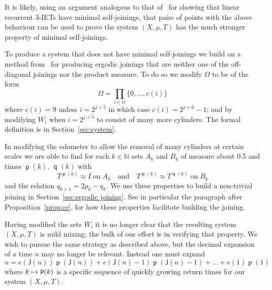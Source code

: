 \documentclass[AHL,Unicode,longabstracts,published]{cedram}
\DeclareMathOperator{\p}{\mathsf{p}}
\DeclareMathOperator{\q}{\mathsf{q}}
\newcommand{\N}{\mathbb{N}}
\newcommand{\scl}{\mathsf{J}}
\let\oldmapsto\mapsto
\renewcommand*{\mapsto}{\mathchoice{\longmapsto}{\oldmapsto}{\oldmapsto}{\oldmapsto}}
\begin{document}
It is likely, using an argument analogous to that of~\cite{MR2129107} for showing that linear recurrent 3-IETs have minimal self-joinings, that pairs of points with the above behaviour can be used to prove the system $(X,\mu,T)$ has the much stronger property of minimal self-joinings.

To produce a system that does not have minimal self-joinings we build on a method from~\cite{MR4269425} for producing ergodic joinings that are neither one of the off-diagonal joinings nor the product measure. To do so we modify $\Omega$ to be of the form
\[
\Omega = \prod_{i \in \N} \{ 0,\dots,c(i) \}
\]
where $c(i) = 9$ unless $i = 2^{j+5}$ in which case $c(i) = 2^{j+6} - 1$; and by modifying $W_i$ when $i = 2^{j+5}$ to consist of many more cylinders. The formal definition is in Section~\ref{sec:system}.

In modifying the odometer to allow the removal of many cylinders at certain scales we are able to find for each $k \in \N$ sets $A_k$ and $B_k$ of measure about 0.5 and times $\p(k)$, $\q(k)$ with
\begin{equation}\label{intro:reduction}
T^{\p(k)} \approx I \;\text{on}\; A_k
\quad\text{and}\quad T^{\p(k)} \approx T^{\q(k)} \;\text{on}\; B_k
\end{equation}
and the relation $q_{k+1} = 2p_k - q_k$. We use these properties to build a non-trivial joining in Section~\ref{sec:ergodic joining}. See in particular the paragraph after Proposition~\ref{prop:ce}, for how these properties facilitate building the joining.

Having modified the sets $W_i$ it is no longer clear that the resulting system $(X,\mu,T)$ is mild mixing; the bulk of our effort is in verifying that property. We wish to pursue the same strategy as described above, but the decimal expansion of a time $n$ may no longer be relevant. Instead one must expand
\begin{equation}\label{intro:expansion}
n = e(\scl(n)) \p(\scl(n)) + e(\scl(n) - 1) \p(\scl(n) - 1) + \dots + e(1) \p(1)
\end{equation}
where $k \mapsto \p(k)$ is a specific sequence of quickly growing return times for our system $(X,\mu,T)$.
\end{document}
